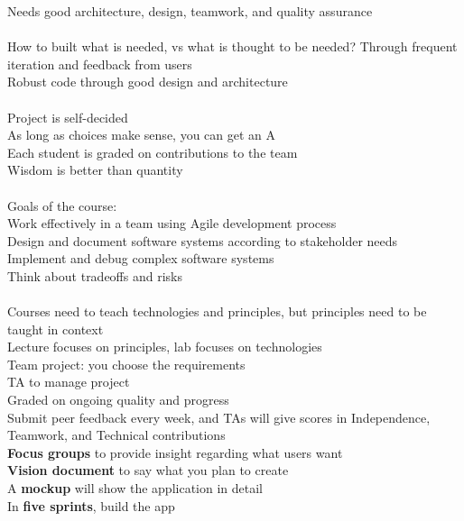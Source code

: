 \documentclass[10pt,letterpaper,unboxed,cm]{article}
\begin{document}
Needs good architecture, design, teamwork, and quality assurance\\\\
How to built what is needed, vs what is thought to be needed? Through frequent iteration and feedback from users\\
Robust code through good design and architecture\\\\
Project is self-decided\\
As long as choices make sense, you can get an A\\
Each student is graded on contributions to the team\\
Wisdom is better than quantity\\\\
Goals of the course: \\
Work effectively in a team using Agile development process\\
Design and document software systems according to stakeholder needs\\
Implement and debug complex software systems\\
Think about tradeoffs and risks\\\\
Courses need to teach technologies and principles, but principles need to be taught in context\\
Lecture focuses on principles, lab focuses on technologies\\
Team project: you choose the requirements\\
TA to manage project\\
Graded on ongoing quality and progress\\
Submit peer feedback every week, and TAs will give scores in Independence, Teamwork, and Technical contributions\\
\textbf{Focus groups} to provide insight regarding what users want\\
\textbf{Vision document} to say what you plan to create\\
A \textbf{mockup} will show the application in detail\\
In \textbf{five sprints}, build the app\\
\end{document}
